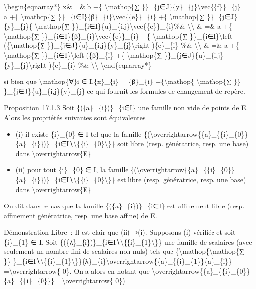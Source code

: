 \documentclass[]{article}
\begin{document}
\textbackslash{}begin\{eqnarray*\} x\& =\& b +\{
\textbackslash{}mathop\{∑
\}\}\_\{j∈J\}\{y\}\_\{j\}\textbackslash{}vec\{\{f\}\}\_\{j\} = a +\{
\textbackslash{}mathop\{∑
\}\}\_\{i∈I\}\{β\}\_\{i\}\textbackslash{}vec\{\{e\}\}\_\{i\} +\{
\textbackslash{}mathop\{∑ \}\}\_\{j∈J\}\{y\}\_\{j\}\{
\textbackslash{}mathop\{∑
\}\}\_\{i∈I\}\{u\}\_\{i,j\}\textbackslash{}vec\{\{e\}\}\_\{i\}\%\&
\textbackslash{}\textbackslash{} \& =\& a +\{ \textbackslash{}mathop\{∑
\}\}\_\{i∈I\}\{β\}\_\{i\}\textbackslash{}vec\{\{e\}\}\_\{i\} +\{
\textbackslash{}mathop\{∑ \}\}\_\{i∈I\}\textbackslash{}left
(\{\textbackslash{}mathop\{∑
\}\}\_\{j∈J\}\{u\}\_\{i,j\}\{y\}\_\{j\}\textbackslash{}right
)\{e\}\_\{i\} \%\& \textbackslash{}\textbackslash{} \& =\& a +\{
\textbackslash{}mathop\{∑ \}\}\_\{i∈I\}\textbackslash{}left
(\{β\}\_\{i\} +\{ \textbackslash{}mathop\{∑
\}\}\_\{j∈J\}\{u\}\_\{i,j\}\{y\}\_\{j\}\textbackslash{}right
)\{e\}\_\{i\} \%\& \textbackslash{}\textbackslash{}
\textbackslash{}end\{eqnarray*\}

si bien que \textbackslash{}mathop\{∀\}i ∈ I,\{x\}\_\{i\} = \{β\}\_\{i\}
+\{\textbackslash{}mathop\{ \textbackslash{}mathop\{∑ \}\}
\}\_\{j∈J\}\{u\}\_\{i,j\}\{y\}\_\{j\} ce qui fournit les formules de
changement de repère.

Proposition~17.1.3 Soit \{(\{a\}\_\{i\})\}\_\{i∈I\} une famille non vide
de points de E. Alors les propriétés suivantes sont équivalentes

\begin{itemize}
\itemsep1pt\parskip0pt
\item
  (i) il existe \{i\}\_\{0\} ∈ I tel que la famille
  \{(\textbackslash{}overrightarrow\{\{a\}\_\{\{i\}\_\{0\}\}\{a\}\_\{i\}\})\}\_\{i∈I∖\textbackslash{}\{\{i\}\_\{0\}\textbackslash{}\}\}
  soit libre (resp. génératrice, resp. une base) dans
  \textbackslash{}overrightarrow\{E\}
\item
  (ii) pour tout \{i\}\_\{0\} ∈ I, la famille
  \{(\textbackslash{}overrightarrow\{\{a\}\_\{\{i\}\_\{0\}\}\{a\}\_\{i\}\})\}\_\{i∈I∖\textbackslash{}\{\{i\}\_\{0\}\textbackslash{}\}\}
  est libre (resp. génératrice, resp. une base) dans
  \textbackslash{}overrightarrow\{E\}
\end{itemize}

On dit dans ce cas que la famille \{(\{a\}\_\{i\})\}\_\{i∈I\} est
affinement libre (resp. affinement génératrice, resp. une base affine)
de E.

Démonstration Libre~: Il est clair que (ii) ⇒(i). Supposons (i) vérifiée
et soit \{i\}\_\{1\} ∈ I. Soit
\{(\{λ\}\_\{i\})\}\_\{i∈I∖\textbackslash{}\{\{i\}\_\{1\}\textbackslash{}\}\}
une famille de scalaires (avec seulement un nombre fini de scalaires non
nuls) tels que \{\textbackslash{}mathop\{\textbackslash{}mathop\{∑ \}\}
\}\_\{i∈I∖\textbackslash{}\{\{i\}\_\{1\}\textbackslash{}\}\}\{λ\}\_\{i\}\textbackslash{}overrightarrow\{\{a\}\_\{\{i\}\_\{1\}\}\{a\}\_\{i\}\}
=\textbackslash{}overrightarrow\{ 0\}. On a alors en notant que
\textbackslash{}overrightarrow\{\{a\}\_\{\{i\}\_\{0\}\}\{a\}\_\{\{i\}\_\{0\}\}\}
=\textbackslash{}overrightarrow\{ 0\})
\end{document}
